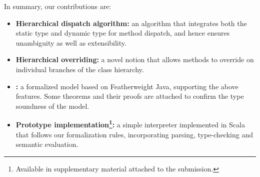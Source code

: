 In summary, our contributions are:
\begin{itemize}
	\item \textbf{Hierarchical dispatch algorithm:} an algorithm that integrates both the static type and dynamic type for method dispatch, and hence
	ensures unambiguity as well as extensibility.
	\item \textbf{Hierarchical overriding:} a novel notion that allows
          methods to override on individual branches of the class hierarchy.
	\item \textbf{\name:} a formalized model based on Featherweight Java, supporting the above features. Some theorems and their proofs
	are attached to confirm the type soundness of the model.
	\item \textbf{Prototype implementation\footnote{Available in supplementary material attached to the submission.}:} a simple interpreter implemented in Scala that follows our formalization rules, incorporating parsing, type-checking and semantic evaluation.
\end{itemize}

 